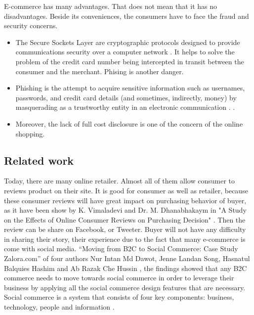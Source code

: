 \documentclass[conference]{IEEEtran}
\begin{document}
E-commerce has many advantages. That does not mean that it has no disadvantages. Beside its conveniences, the consumers have to face the fraud and security concerns.

\begin{itemize}
\item The Secure Sockets Layer are cryptographic protocols designed to provide communications security over a computer network \cite{dierks2008transport}. It helps to solve the problem of the credit card number being intercepted in transit between the consumer and the merchant. Phising is another danger.
\item Phishing is the attempt to acquire sensitive information such as usernames, passwords, and credit card details (and sometimes, indirectly, money) by masquerading as a trustworthy entity in an electronic communication \cite{ramzan2010phishing}. \cite{van2005characteristics}.
\item Moreover, the lack of full cost disclosure is one of the concern of the online shopping.

\end{itemize}


\subsection{Related work}

Today, there are many online retailer. Almost all of them allow consumer to reviews product on their site. It is good for consumer as well as retailer, because these consumer reviews will have great impact on purchasing behavior of buyer, as it have been show by K. Vimaladevi and Dr. M. Dhanabhakaym in "A Study on the Effects of Online Consumer Reviews on Purchasing Decision" \cite{vimaladevi2012study}. Then the review can be share on Facebook, or Tweeter. Buyer will not have any difficulty in sharing their story, their experience due to the fact that many e-commerce is come with social media. “Moving from B2C to Social Commerce: Case Study Zalora.com”  of four authors Nur Intan Md Dawot, Jenne Landan Song, Hasnatul Balquies Hashim and Ab Razak Che Hussin \cite{dawotmoving}, the findings showed that any B2C commerce needs to move towards social commerce in order to leverage their business by applying all the social commerce design features that are necessary. Social commerce is a system that consists of four key components: business, technology, people and information \cite{zhou2013social}.


\end{document}
